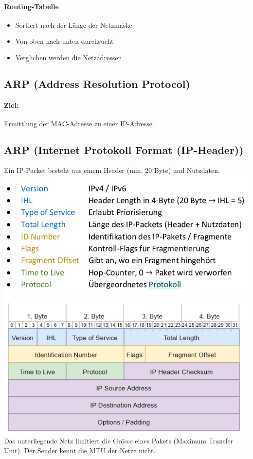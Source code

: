 \paragraph{ Routing-Tabelle}
{
    \begin{itemize}[noitemsep]
        \item Sortiert nach der Länge der Netzmaske
        \item Von oben nach unten durchsucht
        \item Verglichen werden die Netzadressen
    \end{itemize}
}

\subsection{ARP (Address Resolution Protocol)}

\paragraph{Ziel:}  Ermittlung der MAC-Adresse zu einer IP-Adresse.

\subsection{ARP (Internet Protokoll Format (IP-Header))}
{Ein IP-Packet besteht aus einem Header (min. 20 Byte) und Nutzdaten.}
\includegraphics[scale=0.375]{img/ip-header-1.png}
\includegraphics[scale=0.4125]{img/ip-header-2.png.png}
{Das unterliegende Netz limitiert die Grösse eines Pakets (Maximum Transfer Unit). Der Sender kennt die MTU der Netze nicht.}

